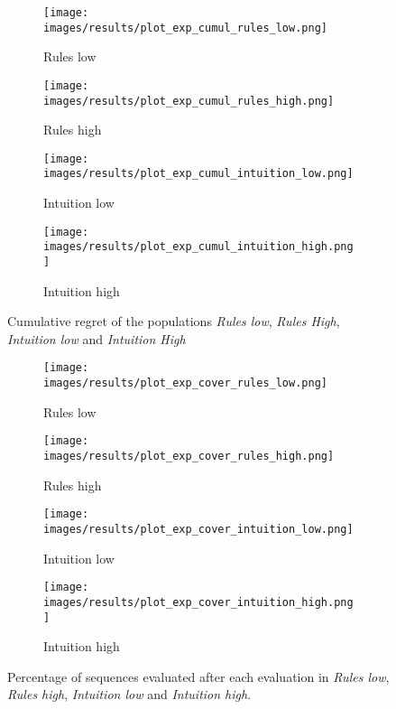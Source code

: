 \begin{figure}[ht]
	\begin{subfigure}{0.49\linewidth}
	\centering
	\texttt{[image: images/results/plot\_exp\_cumul\_rules\_low.png]}
	\caption{Rules low}
	\label{fig:exp_cumul_rules_low}
	\end{subfigure}
	\hfill
	\begin{subfigure}{0.49\linewidth}
	\centering
	\texttt{[image: images/results/plot\_exp\_cumul\_rules\_high.png]}
	\caption{Rules high}
	\label{fig:exp_cumul_rules_high}
	\end{subfigure}
	\begin{subfigure}{0.49\linewidth}
	\centering
	\texttt{[image: images/results/plot\_exp\_cumul\_intuition\_low.png]}
	\caption{Intuition low}
	\label{fig:exp_cumul_intuition_low}
	\end{subfigure}
	\hfill
	\begin{subfigure}{0.49\linewidth}
	\centering
	\texttt{[image: images/results/plot\_exp\_cumul\_intuition\_high.png]}
	\caption{Intuition high}
	\label{fig:exp_cumul_intuition_high}
	\end{subfigure}
	\caption[Cumulative regret in Rules and Intuition]{Cumulative regret of the populations \emph{Rules low}, \emph{Rules
	High}, \emph{Intuition low} and \emph{Intuition High}}
	\label{fig:exp_cumul1}
\end{figure}

\begin{figure}[ht]
	\begin{subfigure}{0.49\linewidth}
	\centering
	\texttt{[image: images/results/plot\_exp\_cover\_rules\_low.png]}
	\caption{Rules low}
	\label{fig:exp_cover_rules_low}
	\end{subfigure}
	\hfill
	\begin{subfigure}{0.49\linewidth}
	\centering
	\texttt{[image: images/results/plot\_exp\_cover\_rules\_high.png]}
	\caption{Rules high}
	\label{fig:exp_cover_rules_high}
	\end{subfigure}
	\begin{subfigure}{0.49\linewidth}
	\centering
	\texttt{[image: images/results/plot\_exp\_cover\_intuition\_low.png]}
	\caption{Intuition low}
	\label{fig:exp_cover_intuition_low}
	\end{subfigure}
	\hfill
	\begin{subfigure}{0.49\linewidth}
	\centering
	\texttt{[image: images/results/plot\_exp\_cover\_intuition\_high.png]}
	\caption{Intuition high}
	\label{fig:exp_cover_intuition_high}
	\end{subfigure}
	\caption[Percentage of sequences evaluated in Rules and Intuition]{Percentage of sequences evaluated after each evaluation in \emph{Rules
	low}, \emph{Rules high}, \emph{Intuition low} and \emph{Intuition high}.}
	\label{fig:exp_cover1}
\end{figure}

